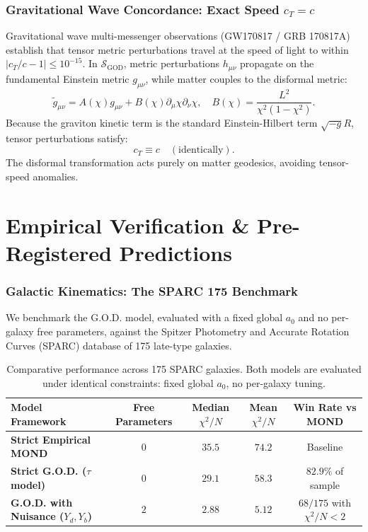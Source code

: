\documentclass[11pt,a4paper]{article}
\theoremstyle{plain}
\theoremstyle{definition}
\theoremstyle{remark}
\begin{document}
\section{Gravitational Wave Concordance: Exact Speed $c_T = c$}

Gravitational wave multi-messenger observations (GW170817 / GRB 170817A) establish that tensor metric perturbations travel at the speed of light to within $|c_T/c - 1| \le 10^{-15}$. In $\mathcal{S}_{\text{GOD}}$, metric perturbations $h_{\mu\nu}$ propagate on the fundamental Einstein metric $g_{\mu\nu}$, while matter couples to the disformal metric:
\begin{equation}
\tilde{g}_{\mu\nu} = A(\chi) g_{\mu\nu} + B(\chi) \partial_\mu \chi \partial_\nu \chi, \quad B(\chi) = \frac{L^2}{\chi^2(1 - \chi^2)}.
\end{equation}
Because the graviton kinetic term is the standard Einstein-Hilbert term $\sqrt{-g} R$, tensor perturbations satisfy:
\begin{equation}
c_T \equiv c \quad (\text{identically}).
\end{equation}
The disformal transformation acts purely on matter geodesics, avoiding tensor-speed anomalies.

\newpage

\part{Empirical Verification \& Pre-Registered Predictions}

\section{Galactic Kinematics: The SPARC 175 Benchmark}

We benchmark the G.O.D. model, evaluated with a fixed global $a_0$ and no per-galaxy free parameters, against the Spitzer Photometry and Accurate Rotation Curves (SPARC) database of 175 late-type galaxies.

\begin{table}[h!]
\centering
\small
\renewcommand{\arraystretch}{1.15}
\begin{tabular}{lcccc}
\toprule
\textbf{Model Framework} & \textbf{Free Parameters} & \textbf{Median $\chi^2/N$} & \textbf{Mean $\chi^2/N$} & \textbf{Win Rate vs MOND} \\
\midrule
\textbf{Strict Empirical MOND} & $0$ & $35.5$ & $74.2$ & Baseline \\
\textbf{Strict G.O.D. ($\tau$ model)} & $0$ & $29.1$ & $58.3$ & $82.9\%$ of sample \\
\textbf{G.O.D. with Nuisance ($Y_d, Y_b$)} & $2$ & $2.88$ & $5.12$ & $68/175$ with $\chi^2/N < 2$ \\
\bottomrule
\end{tabular}
\caption{Comparative performance across 175 SPARC galaxies. Both models are evaluated under identical constraints: fixed global $a_0$, no per-galaxy tuning.}
\end{table}
\end{document}
